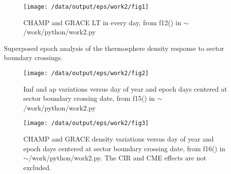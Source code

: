 \documentclass[12pt,a4paper]{article}
\begin{document}
\begin{figure}[!ht]
    \begin{center}
        \texttt{[image: /data/output/eps/work2/fig1]}
        \caption{CHAMP and GRACE LT in every day, from f12() in $\sim$/work/python/work2.py}
    \end{center}
    \label{fig1}
\end{figure}

Superposed epoch analysis of the thermosphere density response to sector boundary crossings.
\begin{figure}[!ht]
    \begin{center}
        \texttt{[image: /data/output/eps/work2/fig2]}
        \caption{Imf and ap variations versus day of year and epoch days centered at sector boundary crossing date, from f15() in $\sim$/work/python/work2.py}
    \end{center}
    \label{fig2}
\end{figure}

\begin{figure}[!ht]
    \begin{center}
        \texttt{[image: /data/output/eps/work2/fig3]}
        \caption{CHAMP and GRACE density variations versus day of year and epoch days centered at sector boundary crossing date, from f16() in $\sim$/work/python/work2.py. The CIR and CME effects are not excluded.}
    \end{center}
    \label{fig3}
\end{figure}
\end{document}

